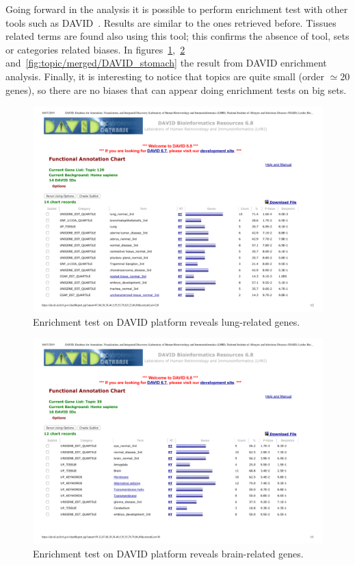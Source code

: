 Going forward in the analysis it is possible to perform enrichment test with other tools such as DAVID~\cite{huang2008bioinformatics,huang2009systematic}. Results are similar to the ones retrieved before. Tissues related terms are found also using this tool; this confirms the absence of tool, sets or categories related biases. In figures~\ref{fig:topic/merged/DAVID_lung},~\ref{fig:topic/merged/DAVID_brain} and~\ref{fig:topic/merged/DAVID_stomach} the result from DAVID enrichment analysis. Finally, it is interesting to notice that topics are quite small (order $\simeq20$ genes), so there are no biases that can appear doing enrichment tests on big sets.
\begin{figure}[htb!]
    \centering
    \includegraphics[width=0.8\linewidth]{pictures/topic/merged/DAVID_lung.pdf}
    \caption{Enrichment test on DAVID platform reveals lung-related genes.}
    \label{fig:topic/merged/DAVID_lung}
\end{figure}
\begin{figure}[htb!]
    \centering
    \includegraphics[width=0.8\linewidth]{pictures/topic/merged/DAVID_brain.pdf}
    \caption{Enrichment test on DAVID platform reveals brain-related genes.}
    \label{fig:topic/merged/DAVID_brain}
\end{figure}
